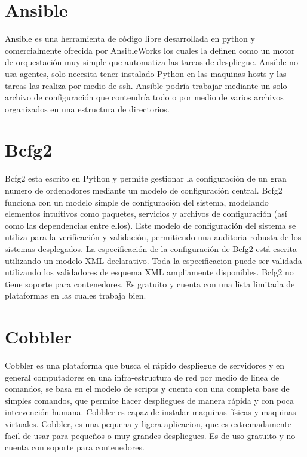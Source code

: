 \section{Ansible}
Ansible \cite{ans16} es una herramienta de código libre desarrollada en python y comercialmente ofrecida por AnsibleWorks los cuales la definen como un motor de orquestación muy simple que automatiza las tareas de despliegue. Ansible no usa agentes, solo necesita tener instalado Python en las maquinas hosts y las tareas las realiza por medio de ssh. Ansible podría trabajar mediante un solo archivo de configuración que contendría todo o por medio de varios archivos organizados en una estructura de directorios. 

\section{Bcfg2}
Bcfg2 esta escrito en Python y permite gestionar la configuración de un gran numero de ordenadores mediante un modelo de configuración central. Bcfg2 funciona con un modelo simple de configuración del sistema, modelando elementos intuitivos como paquetes, servicios y archivos de configuración (así como las dependencias entre ellos). Este modelo de configuración del sistema se utiliza para la verificación  y validación, permitiendo una auditoria robusta de los sistemas desplegados. La especificación de la configuración de Bcfg2 está escrita utilizando un modelo XML declarativo. Toda la especificacion puede ser validada utilizando los validadores de esquema XML ampliamente disponibles. Bcfg2 no tiene soporte para contenedores. Es gratuito y cuenta con una lista limitada de plataformas en las cuales trabaja bien.\cite{bdfg215}

\section{Cobbler}
Cobbler es una plataforma que busca el rápido despliegue de servidores y en general computadores en una infra-estructura de red por medio de linea de comandos, se basa en el modelo de scripts y cuenta con una completa base de simples comandos, que permite hacer despliegues de manera rápida y con poca intervención humana. Cobbler es capaz de instalar maquinas físicas y maquinas virtuales. Cobbler, es una pequena y ligera aplicacion, que es extremadamente facil de usar para pequeños o muy grandes despliegues. Es de uso gratuito y no cuenta con soporte para contenedores. \cite{Cobbler15}

